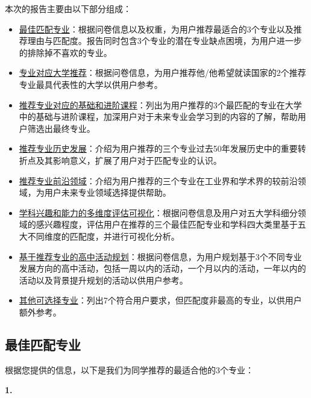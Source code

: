 \documentclass[12pt]{article}
\begin{document}
\begin{CJK*}{UTF8}{gbsn}
   \begin{flushleft}
   本次的报告主要由以下部分组成：
   \begin{itemize} 
       \item \underline{最佳匹配专业}：根据问卷信息以及权重，为用户推荐最适合的3个专业以及推荐理由与匹配度。报告同时包含3个专业的潜在专业缺点困境，为用户进一步的排除掉不喜欢的专业。
       \item \underline{专业对应大学推荐}：根据问卷信息，为用户推荐他/他希望就读国家的2个推荐专业最具代表性的大学以供用户参考。
       \item \underline{推荐专业对应的基础和进阶课程}：列出为用户推荐的3个最匹配的专业在大学中的基础与进阶课程，加深用户对于未来专业会学习到的内容的了解，帮助用户筛选出最终专业。
       \item \underline{推荐专业历史发展}：介绍为用户推荐的三个专业过去50年发展历史中的重要转折点及其影响意义，扩展了用户对于匹配专业的认识。
       \item \underline{推荐专业前沿领域}：介绍为用户推荐的三个专业在工业界和学术界的较前沿领域，为用户未来专业领域选择提供帮助。
       \item \underline{学科兴趣和能力的多维度评估可视化}：根据问卷信息及用户对五大学科细分领域的感兴趣程度，评估用户在推荐的三个最佳匹配专业和学科四大类里基于五大不同维度的匹配度，并进行可视化分析。
       \item \underline{基于推荐专业的高中活动规划}：根据问卷信息，为用户规划基于3个不同专业发展方向的高中活动，包括一周以内的活动，一个月以内的活动，一年以内的活动以及背景提升规划的活动以供用户参考。
       \item \underline{其他可选择专业}：列出7个符合用户要求，但匹配度非最高的专业，以供用户额外参考。
   \end{itemize}
   \end{flushleft}
   \hspace{0pt}
   \vfill
   



   \newpage
   \subsection*{最佳匹配专业}
   根据您提供的信息，以下是我们为同学推荐的最适合他的3个专业：
      
   \textbf{1.} %


   \newpage

\end{CJK*}
\end{document}
